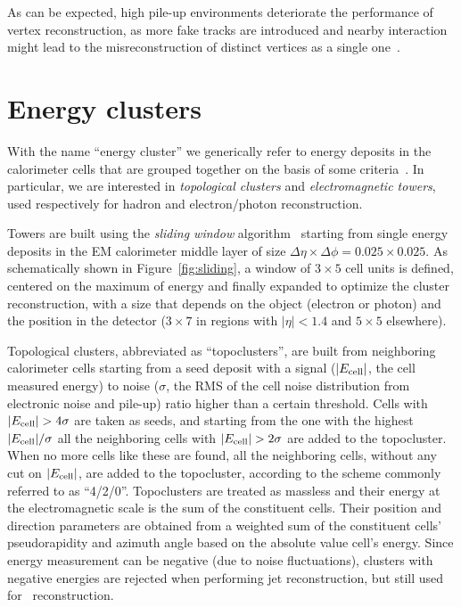 As can be expected, high pile-up environments deteriorate the performance of vertex reconstruction,
as more fake tracks are introduced and nearby interaction might lead to the misreconstruction
of distinct vertices as a single one~\cite{ATLAS-CONF-2012-042}.



\section{Energy clusters}\label{sec:clusters}

With the name ``energy cluster'' we generically refer to energy deposits in the calorimeter
cells that are grouped together on the basis of some criteria~\cite{topocluster}.
In particular, we are interested in {\it topological clusters} and {\it electromagnetic towers},
used respectively for hadron and electron/photon reconstruction.

Towers are built using the {\it sliding window} algorithm~\cite{eperf} starting from
single energy deposits in the EM calorimeter middle layer of size
$\Delta\eta\times\Delta\phi=0.025\times0.025$. As schematically shown in Figure~\ref{fig:sliding},
a window of  $3\times5$ cell units is defined, centered on the maximum of
energy and finally expanded to optimize the cluster reconstruction, with a size
that depends on the object (electron or photon) and the position in the detector
($3\times7$ in regions with $|\eta|<1.4$ and $5\times5$ elsewhere).

Topological clusters, abbreviated as ``topoclusters'', are 
built from neighboring calorimeter cells starting from a seed deposit with a signal 
($|E_{\rm cell}|$, the cell measured energy) to noise 
($\sigma$, the RMS of the cell noise distribution from electronic noise
and pile-up) ratio
higher than a certain threshold. Cells with $|E_{\rm cell}|>4\sigma$ 
are taken as seeds, and starting from the
one with the highest $|E_{\rm cell}|/\sigma$ all the neighboring 
cells with $|E_{\rm cell}| > 2\sigma$ are added to the topocluster.
When no more cells like these are found, all the neighboring
cells, without any cut on $|E_{\rm cell}|$, are added to the topocluster,
according to the scheme commonly referred to as ``4/2/0''.
Topoclusters are treated as massless and their energy at the electromagnetic 
scale is the sum of the constituent cells. Their position and direction parameters
are obtained from a weighted sum of the constituent cells' pseudorapidity and azimuth angle
based on the absolute value cell's energy. Since energy measurement can be negative (due to
noise fluctuations), clusters with negative energies are rejected
when performing jet reconstruction, but still used for \met\ reconstruction.

